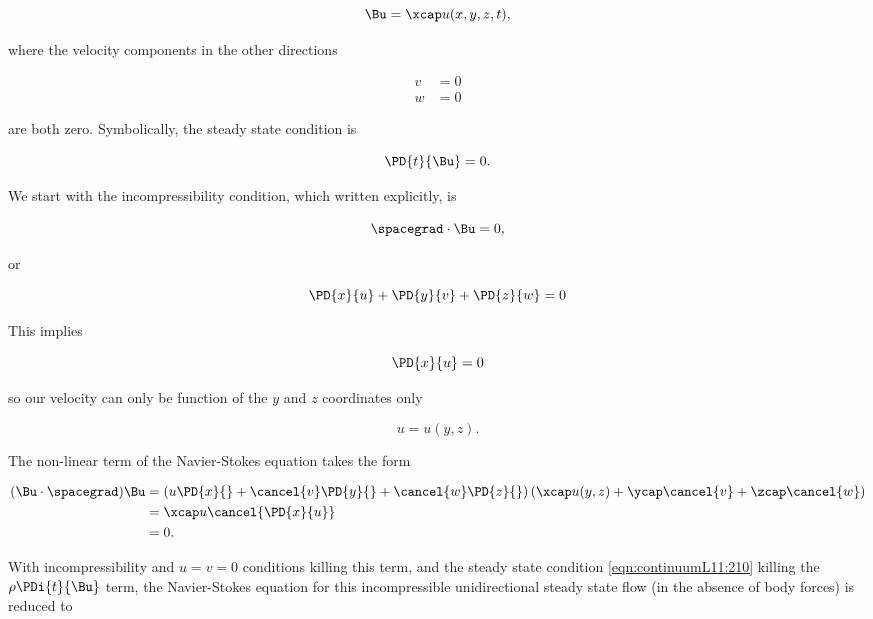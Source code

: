 \begin{equation}\label{eqn:continuumL11:170}
\Bu = \xcap u(x, y, z, t),
\end{equation}

where the velocity components in the other directions

\begin{align}\label{eqn:continuumL11:190}
v &= 0 \\
w &= 0
\end{align}

are both zero.  Symbolically, the steady state condition is 

\begin{equation}\label{eqn:continuumL11:210}
\PD{t}{\Bu} = 0.
\end{equation}

We start with the incompressibility condition, which written explicitly, is

\begin{equation}\label{eqn:continuumL11:230}
\spacegrad \cdot \Bu = 0,
\end{equation}

or

\begin{equation}\label{eqn:continuumL11:250}
\PD{x}{u} + \PD{y}{v} + \PD{z}{w} = 0
\end{equation}

This implies 

\begin{equation}\label{eqn:continuumL11:270}
\PD{x}{u} = 0
\end{equation}

so our velocity can only be function of the $y$ and $z$ coordinates only

\begin{equation}\label{eqn:continuumL11:290}
u = u(y, z).
\end{equation}

The non-linear term of the Navier-Stokes equation takes the form

\begin{align*}
(\Bu \cdot \spacegrad) \Bu
&=
\left(u \PD{x}{}
+\cancel{v} \PD{y}{}
+\cancel{w} \PD{z}{} \right) (\xcap u( y, z) + \ycap \cancel{v} + \zcap \cancel{w} ) \\
&= 
\xcap u \cancel{\PD{x}{u}} \\
&= 0.
\end{align*}

With incompressibility and $u = v = 0$ conditions killing this term, and the steady state condition \ref{eqn:continuumL11:210} killing the $\rho \PDi{t}{\Bu}$ term, the Navier-Stokes equation for this incompressible unidirectional steady state flow (in the absence of body forces) is reduced to

